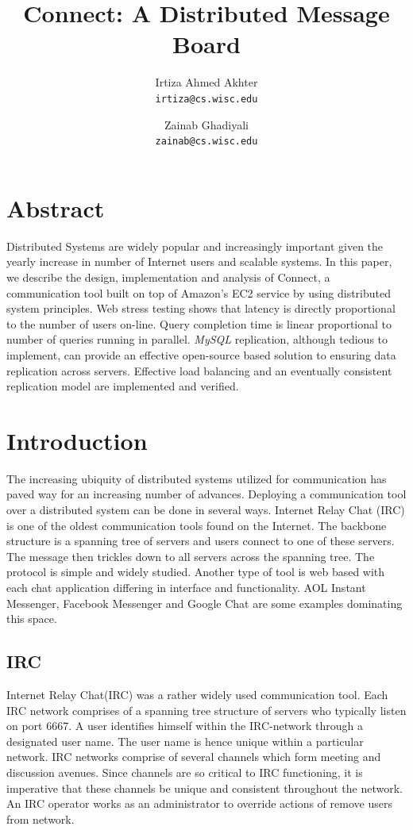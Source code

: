 \documentclass[12pt]{article}
\title{Connect: A Distributed Message Board}
\author{Irtiza Ahmed Akhter\\
\texttt{irtiza@cs.wisc.edu} \and Zainab Ghadiyali\\ \texttt{zainab@cs.wisc.edu}}
\begin{document}
 
\maketitle

\section{Abstract} 

Distributed Systems are widely popular and increasingly
important given the yearly increase in number of Internet users and scalable
systems. In this paper, we describe the design, implementation and analysis of
Connect, a communication tool built on top of Amazon's EC2 service by using distributed
system principles. Web stress testing shows that latency is 
directly proportional to the number of users
on-line. Query completion time is linear proportional to number of queries
running in parallel. \emph{MySQL} replication, although tedious to implement, can
provide an effective open-source based solution to ensuring data replication
across servers. Effective load balancing and an eventually consistent replication model 
are implemented and verified.

\section{Introduction} 
\label{Introduction}

The increasing ubiquity of distributed systems utilized for communication has
paved way for an increasing number of advances. Deploying a communication tool
over a distributed system can be done in several ways. Internet Relay Chat (IRC)
is one of the oldest communication tools found on the Internet. The backbone
structure is a spanning tree of servers and users connect to one of these
servers. The message then trickles down to all servers across the spanning tree.
The protocol is simple and widely studied. Another type of tool is web based
with each chat application differing in interface and functionality. AOL Instant
Messenger, Facebook Messenger and Google Chat are some examples dominating this
space.
 
\subsection{IRC} 

Internet Relay Chat(IRC\cite{IRC}) was a rather widely used
communication tool. Each IRC network comprises of a spanning tree structure of
servers who typically listen on port 6667. A user identifies himself within the
IRC-network through a designated user name. The user name is hence unique within
a particular network.  IRC networks comprise of several channels which form
meeting and discussion avenues. Since channels are so critical to IRC
functioning, it is imperative that these channels be unique and consistent
throughout the network. An IRC operator works as an administrator to override actions of
remove users from network.  
\end{document}
